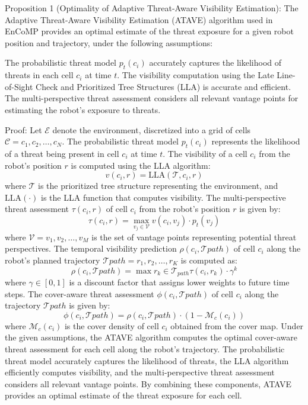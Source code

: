 Proposition 1 (Optimality of Adaptive Threat-Aware Visibility Estimation):
The Adaptive Threat-Aware Visibility Estimation (ATAVE) algorithm used in EnCoMP provides an optimal estimate of the threat exposure for a given robot position and trajectory, under the following assumptions:

The probabilistic threat model $p_t(c_i)$ accurately captures the likelihood of threats in each cell $c_i$ at time $t$.
The visibility computation using the Late Line-of-Sight Check and Prioritized Tree Structures (LLA) is accurate and efficient.
The multi-perspective threat assessment considers all relevant vantage points for estimating the robot's exposure to threats.

Proof:
Let $\mathcal{E}$ denote the environment, discretized into a grid of cells $\mathcal{C} = {c_1, c_2, \ldots, c_N}$. The probabilistic threat model $p_t(c_i)$ represents the likelihood of a threat being present in cell $c_i$ at time $t$. The visibility of a cell $c_i$ from the robot's position $r$ is computed using the LLA algorithm:
\begin{equation}
v(c_i, r) = \text{LLA}(\mathcal{T}, c_i, r)
\end{equation}
where $\mathcal{T}$ is the prioritized tree structure representing the environment, and $\text{LLA}(\cdot)$ is the LLA function that computes visibility.
The multi-perspective threat assessment $\tau(c_i, r)$ of cell $c_i$ from the robot's position $r$ is given by:
\begin{equation}
\tau(c_i, r) = \max_{v_j \in \mathcal{V}} v(c_i, v_j) \cdot p_t(v_j)
\end{equation}
where $\mathcal{V} = {v_1, v_2, \ldots, v_M}$ is the set of vantage points representing potential threat perspectives.
The temporal visibility prediction $\rho(c_i, \mathcal{T}{path})$ of cell $c_i$ along the robot's planned trajectory $\mathcal{T}{path} = {r_1, r_2, \ldots, r_K}$ is computed as:
\begin{equation}
\rho(c_i, \mathcal{T}{path}) = \max{r_k \in \mathcal{T}_{path}} \tau(c_i, r_k) \cdot \gamma^k
\end{equation}
where $\gamma \in [0, 1]$ is a discount factor that assigns lower weights to future time steps.
The cover-aware threat assessment $\phi(c_i, \mathcal{T}{path})$ of cell $c_i$ along the trajectory $\mathcal{T}{path}$ is given by:
\begin{equation}
\phi(c_i, \mathcal{T}{path}) = \rho(c_i, \mathcal{T}{path}) \cdot (1 - \mathcal{M}_c(c_i))
\end{equation}
where $\mathcal{M}_c(c_i)$ is the cover density of cell $c_i$ obtained from the cover map.
Under the given assumptions, the ATAVE algorithm computes the optimal cover-aware threat assessment for each cell along the robot's trajectory. The probabilistic threat model accurately captures the likelihood of threats, the LLA algorithm efficiently computes visibility, and the multi-perspective threat assessment considers all relevant vantage points. By combining these components, ATAVE provides an optimal estimate of the threat exposure for each cell.

